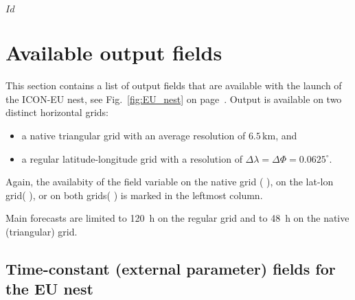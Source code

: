 \svnInfo $Id$


\section{Available output fields}\label{sec_outfields}

This section contains a list of output fields that are available with
the launch of the ICON-EU nest, see Fig.~\ref{fig:EU_nest} on
page~\pageref{fig:EU_nest}.
%
Output is available on two distinct horizontal grids: 
\begin{itemize}
  \item a native triangular grid with an average resolution of $6.5\,\mathrm{km}$, and
  \item a regular latitude-longitude grid with a resolution of $\Delta \lambda = \Delta \Phi=0.0625^{\circ}$. 
\end{itemize}
%
Again, the availabity of the field variable on the native grid
($\,$\markRed$\,$), on the lat-lon grid($\,$\markBlue$\,$), or on both
grids($\,$\markRed\markBlue$\,$) is marked in the leftmost column.

Main forecasts are limited to 120~h on the regular grid and to 48~h on
the native (triangular) grid.


\subsection{Time-constant (external parameter) fields for the EU nest}

